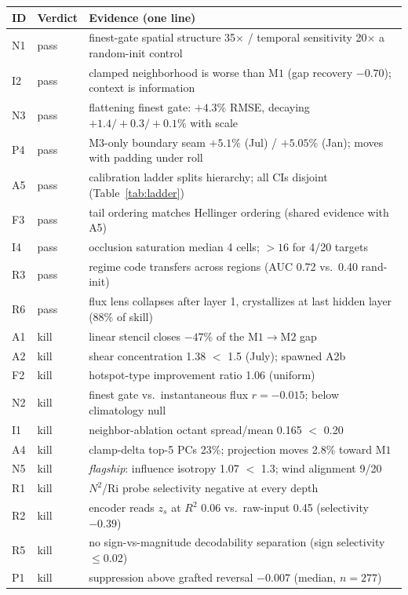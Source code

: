 \documentclass[10pt,twocolumn]{article}
\newcommand{\Mone}{\mathrm{M1}}
\newcommand{\Mtwo}{\mathrm{M2}}
\newcommand{\Mthree}{\mathrm{M3}}
\begin{document}
\small
\begin{longtable}{llp{9.2cm}}
\toprule
ID & Verdict & Evidence (one line) \\
\midrule
\endhead
N1 & pass & finest-gate spatial structure 35$\times$ / temporal sensitivity 20$\times$ a random-init control \\
I2 & pass & clamped neighborhood is worse than $\Mone$ (gap recovery $-0.70$); context is information \\
N3 & pass & flattening finest gate: $+4.3\%$ RMSE, decaying $+1.4/+0.3/+0.1\%$ with scale \\
P4 & pass & $\Mthree$-only boundary seam $+5.1\%$ (Jul) / $+5.05\%$ (Jan); moves with padding under roll \\
A5 & pass & calibration ladder splits hierarchy; all CIs disjoint (Table~\ref{tab:ladder}) \\
F3 & pass & tail ordering matches Hellinger ordering (shared evidence with A5) \\
I4 & pass & occlusion saturation median 4 cells; $>16$ for 4/20 targets \\
R3 & pass & regime code transfers across regions (AUC 0.72 vs.\ 0.40 rand-init) \\
R6 & pass & flux lens collapses after layer 1, crystallizes at last hidden layer (88\% of skill) \\
\addlinespace
A1 & kill & linear stencil closes $-47\%$ of the $\Mone{\to}\Mtwo$ gap \\
A2 & kill & shear concentration 1.38 $<$ 1.5 (July); spawned A2b \\
F2 & kill & hotspot-type improvement ratio 1.06 (uniform) \\
N2 & kill & finest gate vs.\ instantaneous flux $r=-0.015$; below climatology null \\
I1 & kill & neighbor-ablation octant spread/mean 0.165 $<$ 0.20 \\
A4 & kill & clamp-delta top-5 PCs 23\%; projection moves 2.8\% toward $\Mone$ \\
N5 & kill & \emph{flagship}: influence isotropy 1.07 $<$ 1.3; wind alignment 9/20 \\
R1 & kill & $N^2$/Ri probe selectivity negative at every depth \\
R2 & kill & encoder reads $z_s$ at $R^2$ 0.06 vs.\ raw-input 0.45 (selectivity $-0.39$) \\
R5 & kill & no sign-vs-magnitude decodability separation (sign selectivity $\le$0.02) \\
P1 & kill & suppression above grafted reversal $-0.007$ (median, $n{=}277$) \\

\end{longtable}
\end{document}
